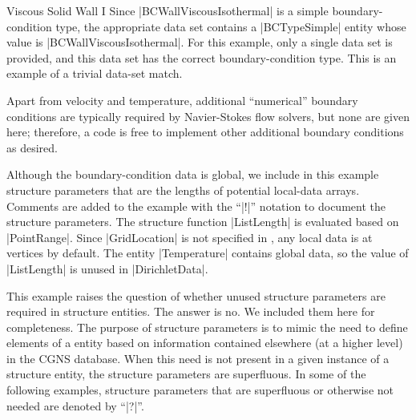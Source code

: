 \begin{example}{Viscous Solid Wall I}
Since |BCWallViscousIsothermal| is a simple boundary-condition type,
the appropriate data set contains a |BCTypeSimple| entity whose value
is |BCWallViscousIsothermal|.  For this example, only a single data set
is provided, and this data set has the correct boundary-condition type.
This is an example of a trivial data-set match.

Apart from velocity and temperature, additional ``numerical'' boundary
conditions are typically required by Navier-Stokes flow solvers, but
none are given here; therefore, a code is free to implement other
additional boundary conditions as desired.

Although the boundary-condition data is global, we include in this
example structure parameters that are the lengths of potential
local-data arrays.
Comments are added to the example with the ``|!|'' notation to document
the structure parameters.
The  structure function |ListLength| is evaluated based on
|PointRange|.
Since |GridLocation| is not specified in , any local data is
at vertices by default.
The entity |Temperature| contains global data, so the value of
|ListLength| is unused in |DirichletData|.

This example raises the question of whether unused structure parameters
are required in structure entities.  The answer is no.  We included them
here for completeness.  The purpose of structure parameters is to mimic
the need to define elements of a entity based on information contained
elsewhere (at a higher level) in the CGNS database.  When this need is
not present in a given instance of a structure entity, the structure
parameters are superfluous.
In some of the following examples, structure parameters that are superfluous
or otherwise not needed are denoted by ``|?|''.
\end{example}

